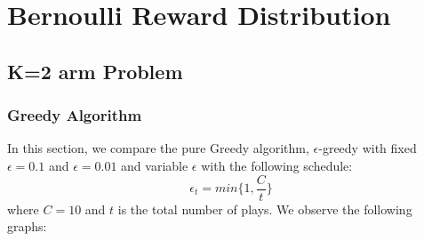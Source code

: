 \documentclass{article}
\begin{document}
\section{Bernoulli Reward Distribution}
	\subsection{K=2 arm Problem}
		\subsubsection{Greedy Algorithm}
		
		In this section, we compare the pure Greedy algorithm, $\epsilon$-greedy with fixed $\epsilon=0.1$ and $\epsilon=0.01$ and variable $\epsilon$ with the 
		following schedule:
		\begin{equation}
			\epsilon_{t} = min\{1, \frac{C}{t}\}
		\label{epsilon_greedy_schedule}
		\end{equation}
		where $C=10$ and $t$ is the total number of plays. We observe the following graphs:
		
\end{document}
